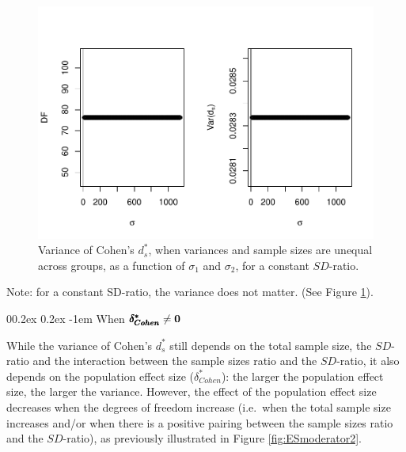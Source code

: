 \documentclass[
  english,
  man]{apa6}
\makeatletter
\let\oldparagraph\paragraph
\renewcommand{\paragraph}[1]{\oldparagraph{#1}\mbox{}}
\renewcommand{\paragraph}{\@startsection{paragraph}{4}{\parindent}%
  {0\baselineskip \@plus 0.2ex \@minus 0.2ex}%
  {-1em}%
  {\normalfont\normalsize\bfseries\itshape\typesectitle}}
\makeatother
\begin{document}
\begin{figure}
\centering
\includegraphics{Theoretical-Variance-of-all-estimators-as-a-function-of-population-parameters_files/figure-latex/varcohendprimehetunbalvariance2-1.pdf}
\caption{\label{fig:varcohendprimehetunbalvariance2}Variance of Cohen's \(d^*_s\), when variances and sample sizes are unequal across groups, as a function of \(\sigma_1\) and \(\sigma_2\), for a constant \(SD\)-ratio.}
\end{figure}

Note: for a constant SD-ratio, the variance does not matter. (See Figure \ref{fig:varcohendprimehetunbalvariance2}).

\hypertarget{when-bf-pmbdelta_cohen-neq-0-3}{%
\paragraph{\texorpdfstring{When \(\bf \pmb{\delta^*_{Cohen}} \neq 0\)}{When \textbackslash bf \textbackslash pmb\{\textbackslash delta\^{}*\_\{Cohen\}\} \textbackslash neq 0}}\label{when-bf-pmbdelta_cohen-neq-0-3}}

While the variance of Cohen's \(d^*_s\) still depends on the total sample size, the \(SD\)-ratio and the interaction between the sample sizes ratio and the \(SD\)-ratio, it also depends on the population effect size (\(\delta^*_{Cohen}\)): the larger the population effect size, the larger the variance. However, the effect of the population effect size decreases when the degrees of freedom increase (i.e.~when the total sample size increases and/or when there is a positive pairing between the sample sizes ratio and the \(SD\)-ratio), as previously illustrated in Figure \ref{fig:ESmoderator2}.
\end{document}
